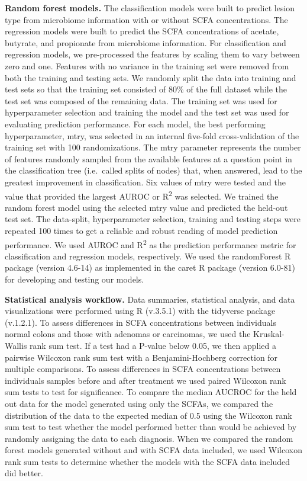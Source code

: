 \documentclass[11pt,]{article}
\begin{document}
\textbf{Random forest models.} The classification models were built to
predict lesion type from microbiome information with or without SCFA
concentrations. The regression models were built to predict the SCFA
concentrations of acetate, butyrate, and propionate from microbiome
information. For classification and regression models, we pre-processed
the features by scaling them to vary between zero and one. Features with
no variance in the training set were removed from both the training and
testing sets. We randomly split the data into training and test sets so
that the training set consisted of 80\% of the full dataset while the
test set was composed of the remaining data. The training set was used
for hyperparameter selection and training the model and the test set was
used for evaluating prediction performance. For each model, the best
performing hyperparameter, mtry, was selected in an internal five-fold
cross-validation of the training set with 100 randomizations. The mtry
parameter represents the number of features randomly sampled from the
available features at a question point in the classification tree
(i.e.~called splits of nodes) that, when answered, lead to the greatest
improvement in classification. Six values of mtry were tested and the
value that provided the largest AUROC or R\textsuperscript{2} was
selected. We trained the random forest model using the selected mtry
value and predicted the held-out test set. The data-split,
hyperparameter selection, training and testing steps were repeated 100
times to get a reliable and robust reading of model prediction
performance. We used AUROC and R\textsuperscript{2} as the prediction
performance metric for classification and regression models,
respectively. We used the randomForest R package (version 4.6-14) as
implemented in the caret R package (version 6.0-81) for developing and
testing our models.

\textbf{Statistical analysis workflow.} Data summaries, statistical
analysis, and data visualizations were performed using R (v.3.5.1) with
the tidyverse package (v.1.2.1). To assess differences in SCFA
concentrations between individuals normal colons and those with adenomas
or carcinomas, we used the Kruskal-Wallis rank sum test. If a test had a
P-value below 0.05, we then applied a pairwise Wilcoxon rank sum test
with a Benjamini-Hochberg correction for multiple comparisons. To assess
differences in SCFA concentrations between individuals samples before
and after treatment we used paired Wilcoxon rank sum tests to test for
significance. To compare the median AUCROC for the held out data for the
model generated using only the SCFAs, we compared the distribution of
the data to the expected median of 0.5 using the Wilcoxon rank sum test
to test whether the model performed better than would be achieved by
randomly assigning the data to each diagnosis. When we compared the
random forest models generated without and with SCFA data included, we
used Wilcoxon rank sum tests to determine whether the models with the
SCFA data included did better.
\end{document}
